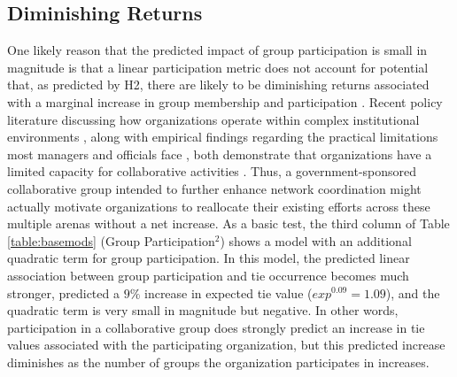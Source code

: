 \documentclass[12pt,a4paper,titlepage]{article}
\begin{document}
\subsection{Diminishing Returns}

One likely reason that the predicted impact of group participation is small in magnitude is that a linear participation metric does not account for potential that, as predicted by H2, there are likely to be diminishing returns associated with a marginal increase in group membership and participation \parencite{lubell2010}. Recent policy literature discussing how organizations operate within complex institutional environments \parencite[e.g.,][]{lubell2013,berardo2010}, along with empirical findings regarding the practical limitations most managers and officials face \parencite{thomas2003,margerum2011}, both demonstrate that organizations have a limited capacity for collaborative activities \parencite{lubell2010}. Thus, a government-sponsored collaborative group intended to further enhance network coordination might actually motivate organizations to reallocate their existing efforts across these multiple arenas without a net increase. As a basic test, the third column of Table \ref{table:basemods} (Group Participation$^2$) shows a model with an additional quadratic term for group participation. In this model, the predicted linear association between group participation and tie occurrence becomes much stronger, predicted a $9\%$ increase in expected tie value ($exp^{0.09} = 1.09$), and the quadratic term is very small in magnitude but negative. In other words, participation in a collaborative group does strongly predict an increase in tie values associated with the participating organization, but this predicted increase diminishes as the number of groups the organization participates in increases.
\end{document}
